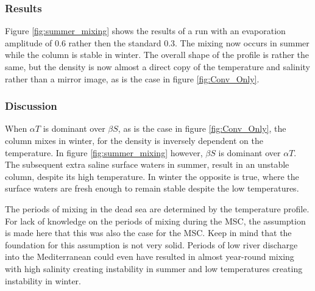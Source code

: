 \documentclass[twocolumn]{article}
\begin{document}
\subsubsection{Results}
Figure \ref{fig:summer_mixing} shows the results of a run with an evaporation amplitude of 0.6 rather then the standard 0.3. The mixing now occurs in summer while the column is stable in winter. The overall shape of the profile is rather the same, but the density is now almost a direct copy of the temperature and salinity rather than a mirror image, as is the case in figure \ref{fig:Conv_Only}. 


\subsubsection{Discussion}
\label{sect:Summer_mixing_discussion}
When $\alpha T$ is dominant over $\beta S$, as is the case in figure \ref{fig:Conv_Only}, the column mixes in winter, for the density is inversely dependent on
the temperature. In figure \ref{fig:summer_mixing} however, $\beta S$ is dominant over $\alpha T$. The subsequent extra saline surface waters in summer, result in an unstable column, despite its high temperature. In winter the opposite is true, where the surface waters are fresh enough to remain stable despite the low temperatures.

The periods of mixing in the dead sea are determined by the temperature profile. For lack of knowledge on the periods of mixing during the MSC, the assumption is made here that this was also the case for the MSC. Keep in mind that the foundation for this assumption is not very solid. Periods of low river discharge into the Mediterranean could even have resulted in almost year-round mixing with high salinity creating instability in summer and low temperatures creating instability in winter. 
\end{document}
